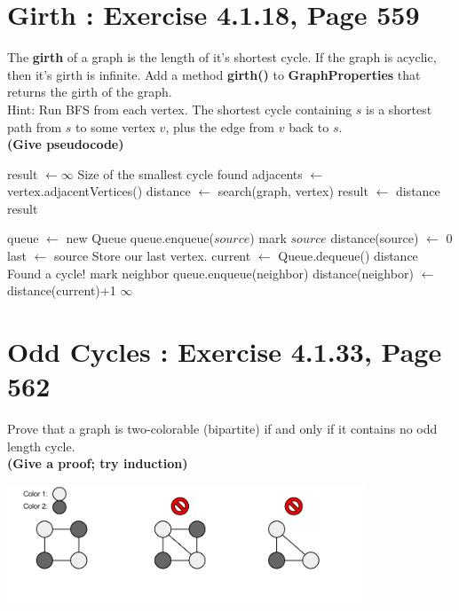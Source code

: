 \documentclass[12pt]{article}
\begin{document}
\maketitle

\section{Girth : Exercise 4.1.18, Page 559}
The {\bf girth} of a graph is the length of it's shortest cycle. If the graph is acyclic, then it's girth is infinite. Add a method {\bf girth()} to {\bf GraphProperties} that returns the girth of the graph. \\
Hint: Run BFS from each vertex. The shortest cycle containing $s$ is a shortest path from $s$ to some vertex $v$, plus the edge from $v$ back to $s$. \\
{\bf (Give pseudocode)} \\

\begin{algorithm}
\begin{algorithmic}[1]
		\State result $\gets \infty$ 
		\Comment Size of the smallest cycle found
			\State adjacents $\gets$ vertex.adjacentVertices()
			\State distance $\gets$ search(graph, vertex)
				\State result $\gets$ distance
			\EndIf
		\EndFor
		\State \Return result
	\EndFunction
	
		\State queue $\gets$ new Queue
		\State queue.enqueue($source$)
		\State mark $source$
		\State distance(source) $\gets$ 0
		\State last $\gets$ source
		\Comment Store our last vertex.
			\State current $\gets$ Queue.dequeue()
					\State \Return distance
					\Comment Found a cycle!
				\EndIf
				\State mark neighbor
				\State queue.enqueue(neighbor)
				\State distance(neighbor) $\gets$ distance(current)+1
			\EndFor
		\EndWhile
		\State \Return $\infty$
	\EndFunction
\end{algorithmic}
\end{algorithm}
\clearpage


\section{Odd Cycles : Exercise 4.1.33, Page 562}
Prove that a graph is two-colorable (bipartite) if and only if it contains no odd length cycle. \\
{\bf (Give a proof; try induction)} \\
\begin{center}
\includegraphics[width=0.8\textwidth]{figures/path.png}
\end{center}
\end{document}
